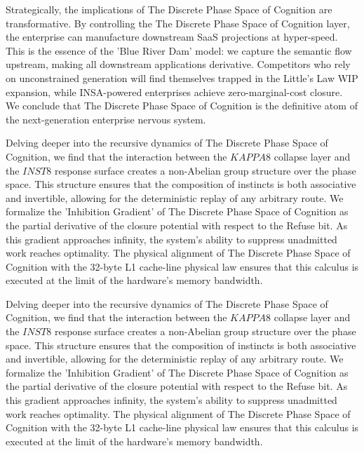 \documentclass[12pt,a4paper,oneside]{book}
\begin{document}
Strategically, the implications of The Discrete Phase Space of Cognition are transformative. By controlling the The Discrete Phase Space of Cognition layer, the enterprise can manufacture downstream SaaS projections at hyper-speed. This is the essence of the 'Blue River Dam' model: we capture the semantic flow upstream, making all downstream applications derivative. Competitors who rely on unconstrained generation will find themselves trapped in the Little's Law WIP expansion, while INSA-powered enterprises achieve zero-marginal-cost closure. We conclude that The Discrete Phase Space of Cognition is the definitive atom of the next-generation enterprise nervous system. 

Delving deeper into the recursive dynamics of The Discrete Phase Space of Cognition, we find that the interaction between the $KAPPA8$ collapse layer and the $INST8$ response surface creates a non-Abelian group structure over the phase space. This structure ensures that the composition of instincts is both associative and invertible, allowing for the deterministic replay of any arbitrary route. We formalize the 'Inhibition Gradient' of The Discrete Phase Space of Cognition as the partial derivative of the closure potential with respect to the Refuse bit. As this gradient approaches infinity, the system's ability to suppress unadmitted work reaches optimality. The physical alignment of The Discrete Phase Space of Cognition with the 32-byte L1 cache-line physical law ensures that this calculus is executed at the limit of the hardware's memory bandwidth. 

Delving deeper into the recursive dynamics of The Discrete Phase Space of Cognition, we find that the interaction between the $KAPPA8$ collapse layer and the $INST8$ response surface creates a non-Abelian group structure over the phase space. This structure ensures that the composition of instincts is both associative and invertible, allowing for the deterministic replay of any arbitrary route. We formalize the 'Inhibition Gradient' of The Discrete Phase Space of Cognition as the partial derivative of the closure potential with respect to the Refuse bit. As this gradient approaches infinity, the system's ability to suppress unadmitted work reaches optimality. The physical alignment of The Discrete Phase Space of Cognition with the 32-byte L1 cache-line physical law ensures that this calculus is executed at the limit of the hardware's memory bandwidth. 
\end{document}

